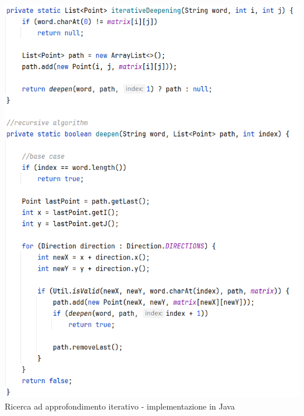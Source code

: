\documentclass[10pt,a4paper]{article}
\begin{document}
	\begin{center}
		\includegraphics[width=1\textwidth]{iterativeDeepening}
		Ricerca ad approfondimento iterativo - implementazione in Java
		\newpage
	\end{center}
\end{document}
